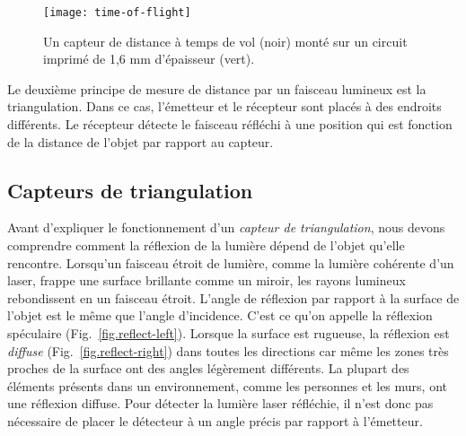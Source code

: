 \begin{figure}
\texttt{[image: time-of-flight]}
\caption{Un capteur de distance à temps de vol (noir) monté sur un circuit imprimé de 1,6 mm d'épaisseur (vert).}\label{fig.ir}
\end{figure}

Le deuxième principe de mesure de distance par un faisceau lumineux est la triangulation. Dans ce cas, l'émetteur et le récepteur sont placés à des endroits différents. Le récepteur détecte le faisceau réfléchi à une position qui est fonction de la distance de l'objet par rapport au capteur.

\subsection{Capteurs de triangulation}\label{s.triangulating-sensors}

Avant d'expliquer le fonctionnement d'un \emph{capteur de triangulation}, nous devons comprendre comment la réflexion de la lumière dépend de l'objet qu'elle rencontre. Lorsqu'un faisceau étroit de lumière, comme la lumière cohérente d'un laser, frappe une surface brillante comme un miroir, les rayons lumineux rebondissent en un faisceau étroit. L'angle de réflexion par rapport à la surface de l'objet est le même que l'angle d'incidence. C'est ce qu'on appelle la réflexion spéculaire (Fig.~\ref{fig.reflect-left}). Lorsque la surface est rugueuse, la réflexion est \emph{diffuse} (Fig.~\ref{fig.reflect-right}) dans toutes les directions car même les zones très proches de la surface ont des angles légèrement différents. La plupart des éléments présents dans un environnement, comme les personnes et les murs, ont une réflexion diffuse. Pour détecter la lumière laser réfléchie, il n'est donc pas nécessaire de placer le détecteur à un angle précis par rapport à l'émetteur.

